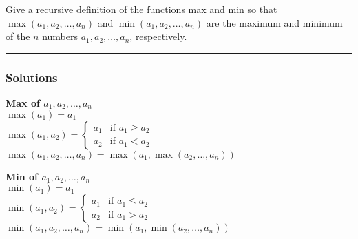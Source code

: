 \newpage
\begin{question}
Give a recursive definition of the functions max and min so that $\max \left(a_1, a_2, \ldots, a_n\right)$ and $\min \left(a_1, a_2, \ldots, a_n\right)$ are the maximum and minimum of the $n$ numbers $a_1, a_2, \ldots, a_n$, respectively.
\end{question}

\par\noindent\rule{\textwidth}{0.5pt}

\subsubsection*{Solutions}

\begin{definition}
    \textbf{Max of $a_1, a_2, \dots, a_n$}\\
    $\max(a_1) = a_1$\\
    $\max(a_1, a_2) =
    \begin{cases}
        a_1 & \text{if } a_1 \geq a_2\\
        a_2 & \text{if } a_1 < a_2
    \end{cases}$\\
    $\max(a_1, a_2, \dots, a_n) = \max(a_1, \max(a_2, \dots, a_n))$
\end{definition}

\bigskip


\begin{definition}
    \textbf{Min of $a_1, a_2, \dots, a_n$}\\
    $\min(a_1) = a_1$\\
    $\min(a_1, a_2) =
    \begin{cases}
        a_1 & \text{if } a_1 \leq a_2\\
        a_2 & \text{if } a_1 > a_2
    \end{cases}$\\
    $\min(a_1, a_2, \dots, a_n) = \min(a_1, \min(a_2, \dots, a_n))$
\end{definition}